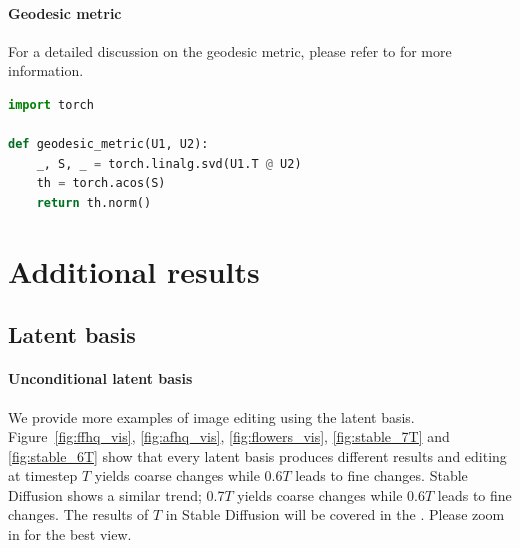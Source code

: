 \paragraph{Geodesic metric}
For a detailed discussion on the geodesic metric, please refer to \citet{choi2021not} for more information.

\begin{lstlisting}[language=Python, caption={\textbf{Geodesic metric}}]
import torch

def geodesic_metric(U1, U2):
    _, S, _ = torch.linalg.svd(U1.T @ U2)
    th = torch.acos(S)
    return th.norm()
\end{lstlisting}


\clearpage

\section{Additional results}
\label{appendix:additional_results}
\subsection{Latent basis}
\label{appendix:local}
\paragraph{Unconditional latent basis}
We provide more examples of image editing using the latent basis. Figure~\ref{fig:ffhq_vis}, \ref{fig:afhq_vis}, \ref{fig:flowers_vis}, \ref{fig:stable_7T} and \ref{fig:stable_6T} show that every latent basis produces different results and editing at timestep $T$ yields coarse changes while 0.6$T$ leads to fine changes. Stable Diffusion shows a similar trend; 0.7$T$ yields coarse changes while 0.6$T$ leads to fine changes. The results of $T$ in Stable Diffusion will be covered in the . Please zoom in for the best view.

